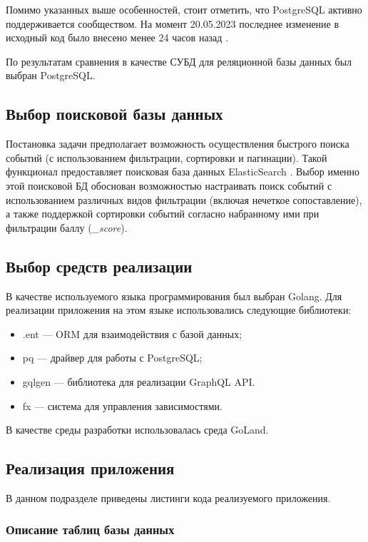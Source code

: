 Помимо указанных выше особенностей, стоит отметить, что PostgreSQL активно поддерживается сообществом. На момент 20.05.2023 последнее изменение в исходный код было внесено менее 24 часов назад \cite{postgres-github}.

По результатам сравнения в качестве СУБД для реляционной базы данных был выбран PostgreSQL.

\subsection{Выбор поисковой базы данных}

Постановка задачи предполагает возможность осуществления быстрого поиска событий (с использованием фильтрации, сортировки и пагинации). Такой функционал предоставляет поисковая база данных ElasticSearch \cite{elastic}. Выбор именно этой поисковой БД обоснован возможностью настраивать поиск событий с использованием различных видов фильтрации (включая нечеткое сопоставление), а также поддержкой сортировки событий согласно набранному ими при фильтрации баллу (\textit{\_score}). 

\subsection{Выбор средств реализации}

В качестве используемого языка программирования был выбран Golang. Для реализации приложения на этом языке использовались следующие библиотеки:
\begin{itemize}[]
	\item .ent \cite{ent} --- ORM для взаимодействия с базой данных;
	\item pq \cite{pq} --- драйвер для работы с PostgreSQL;
	\item gqlgen \cite{gqlgen} --- библиотека для реализации GraphQL API.
	\item fx \cite{fx} --- система для управления зависимостями.
\end{itemize}

В качестве среды разработки использовалась среда GoLand.

\subsection{Реализация приложения}

В данном подразделе приведены листинги кода реализуемого приложения.

\subsubsection{Описание таблиц базы данных}

